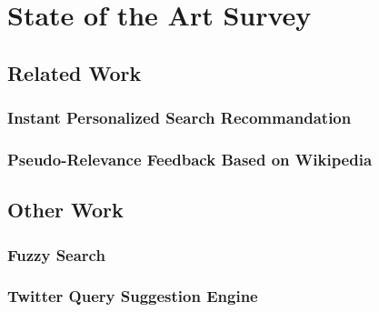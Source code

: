 \chapter{State of the Art Survey}
\label{ch:related-work}

\section{Related Work}

\subsection{Instant Personalized Search Recommandation}

\subsection{Pseudo-Relevance Feedback Based on Wikipedia}

\section{Other Work}

\subsection{Fuzzy Search}

\subsection{Twitter Query Suggestion Engine}
